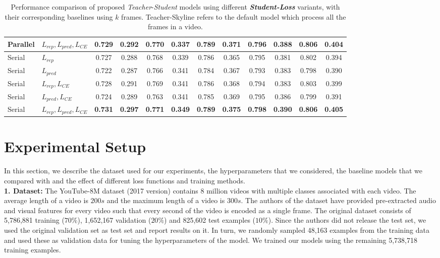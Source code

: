 \documentclass[10pt,twocolumn,letterpaper]{article}
\begin{document}
\begin{table*}[t]
{\begin{tabular}{|l|l|c|c|c|c|c|c|c|c|c|c|}
        Parallel & $L_{rep},L_{pred},L_{CE}$ & 0.729 & 0.292 & 0.770 & 0.337 & \textbf{0.789} & 0.371 & \multicolumn{1}{l|}{0.796} & 0.388 & \textbf{0.806} & 0.404 \\ \hline
        Serial & $L_{rep}$ & 0.727 & 0.288 & 0.768 & 0.339 & 0.786 & 0.365 & 0.795 & 0.381 & 0.802 & 0.394 \\
        Serial & $L_{pred}$ & 0.722 & 0.287 &  0.766 & 0.341 &  0.784 &  0.367 &  0.793 &  0.383&  0.798 & 0.390\\        
        Serial & $L_{rep},L_{CE}$ & 0.728 & 0.291 & 0.769 & 0.341 & 0.786 & 0.368 & 0.794 & 0.383 & 0.803 & 0.399 \\ 
        Serial & $L_{pred},L_{CE}$ &  0.724 & 0.289 & 0.763 & 0.341 & 0.785 & 0.369 & 0.795 & 0.386 & 0.799 & 0.391 \\     
        Serial & $L_{rep},L_{pred},L_{CE}$ & \textbf{0.731} & \textbf{0.297} & \textbf{0.771} & \textbf{0.349} & \textbf{0.789} & \textbf{0.375} & \textbf{0.798} & \textbf{0.390} &\textbf{ 0.806} & \textbf{0.405} \\ \hline
\end{tabular}
}
\caption{Performance comparison of proposed \textit{Teacher}-\textit{Student} models using different \textit{\textbf{Student-Loss}} variants, with their corresponding baselines using $k$ frames. Teacher-Skyline refers to the default model which process all the frames in a video.}
\label{tab-perform}
\end{table*}

\section{Experimental Setup}
In this section, we describe the dataset used for our experiments, the hyperparameters that we considered, the baseline models that we compared with and the effect of different loss functions and training methods.\\

\noindent \textbf{1. Dataset:}
The YouTube-8M dataset (2017 version) \cite{Youtube8m} contains 8
million videos with multiple classes associated with each video. The average length of a video is $200s$ and the maximum length of a video is $300s$. The authors of the dataset have provided pre-extracted audio and visual features for every video such that every second of the video is encoded as a single frame. The original dataset consists of 5,786,881 training ($70\%$), 1,652,167 validation ($20\%$) and 825,602 test examples ($10\%$). Since the authors did not release the test set, we used the original validation set as test set and report results on it. In turn, we randomly sampled 48,163 examples from the training data and used these as validation data for tuning the hyperparameters of the model. We trained our models using the remaining 5,738,718 training examples.
\end{document}
